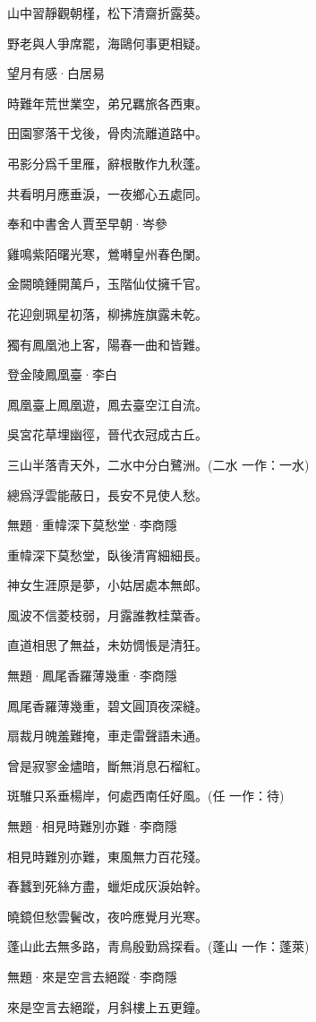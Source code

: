 \documentclass[12pt,a4paper]{ctexbook}
\begin{document}
山中習靜觀朝槿，松下清齋折露葵。\par
野老與人爭席罷，海鷗何事更相疑。\par
望月有感·白居易\par
時難年荒世業空，弟兄羈旅各西東。\par
田園寥落干戈後，骨肉流離道路中。\par
弔影分爲千里雁，辭根散作九秋蓬。\par
共看明月應垂淚，一夜鄉心五處同。\par
奉和中書舍人賈至早朝·岑參\par
雞鳴紫陌曙光寒，鶯囀皇州春色闌。\par
金闕曉鍾開萬戶，玉階仙仗擁千官。\par
花迎劍珮星初落，柳拂旌旗露未乾。\par
獨有鳳凰池上客，陽春一曲和皆難。\par
登金陵鳳凰臺·李白\par
鳳凰臺上鳳凰遊，鳳去臺空江自流。\par
吳宮花草埋幽徑，晉代衣冠成古丘。\par
三山半落青天外，二水中分白鷺洲。(二水 一作：一水)\par
總爲浮雲能蔽日，長安不見使人愁。\par
無題·重幃深下莫愁堂·李商隱\par
重幃深下莫愁堂，臥後清宵細細長。\par
神女生涯原是夢，小姑居處本無郎。\par
風波不信菱枝弱，月露誰教桂葉香。\par
直道相思了無益，未妨惆悵是清狂。\par
無題·鳳尾香羅薄幾重·李商隱\par
鳳尾香羅薄幾重，碧文圓頂夜深縫。\par
扇裁月魄羞難掩，車走雷聲語未通。\par
曾是寂寥金燼暗，斷無消息石榴紅。\par
斑騅只系垂楊岸，何處西南任好風。(任 一作：待)\par
無題·相見時難別亦難·李商隱\par
相見時難別亦難，東風無力百花殘。\par
春蠶到死絲方盡，蠟炬成灰淚始幹。\par
曉鏡但愁雲鬢改，夜吟應覺月光寒。\par
蓬山此去無多路，青鳥殷勤爲探看。(蓬山 一作：蓬萊)\par
無題·來是空言去絕蹤·李商隱\par
來是空言去絕蹤，月斜樓上五更鐘。\par
\end{document}
